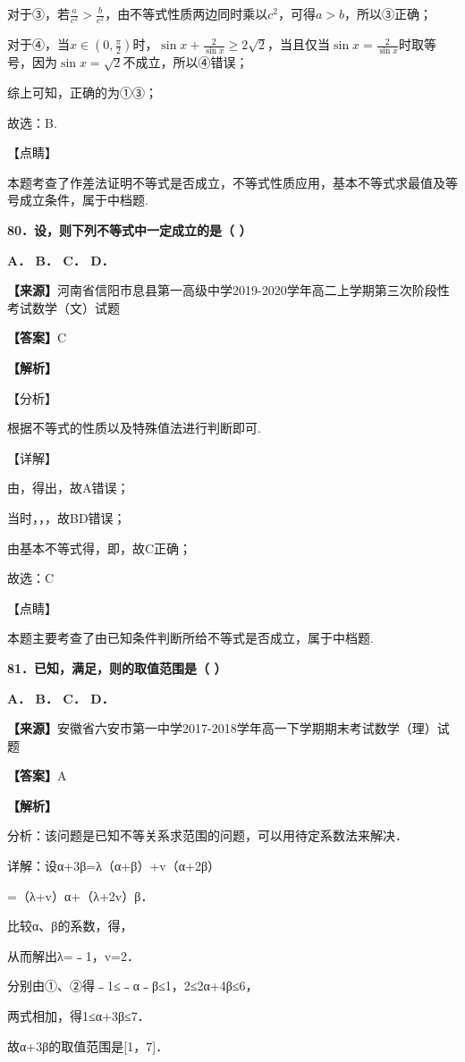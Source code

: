 对于③，若\(\frac{a}{c^{2}} > \frac{b}{c^{2}}\)，由不等式性质两边同时乘以\(c^{2}\)，可得\(a > b\)，所以③正确；

对于④，当\(x \in \left( 0,\frac{\pi}{2} \right)\)时，\(\sin x + \frac{2}{\sin x} \geq 2\sqrt{2}\)，当且仅当\(\sin x = \frac{2}{\sin x}\)时取等号，因为\(\sin x = \sqrt{2}\)不成立，所以④错误；

综上可知，正确的为①③；

故选：B.

【点睛】

本题考查了作差法证明不等式是否成立，不等式性质应用，基本不等式求最值及等号成立条件，属于中档题.

\textbf{80．设，则下列不等式中一定成立的是（ ）}

\textbf{A． B． C． D．}

\textbf{【来源】}河南省信阳市息县第一高级中学2019-2020学年高二上学期第三次阶段性考试数学（文）试题

\textbf{【答案】}C

\textbf{【解析】}

【分析】

根据不等式的性质以及特殊值法进行判断即可.

【详解】

由，得出，故A错误；

当时，，，故BD错误；

由基本不等式得，即，故C正确；

故选：C

【点睛】

本题主要考查了由已知条件判断所给不等式是否成立，属于中档题.

\textbf{81．已知，满足，则的取值范围是（ ）}

\textbf{A． B． C． D．}

\textbf{【来源】}安徽省六安市第一中学2017-2018学年高一下学期期末考试数学（理）试题

\textbf{【答案】}A

\textbf{【解析】}

分析：该问题是已知不等关系求范围的问题，可以用待定系数法来解决．

详解：设α+3β=λ（α+β）+v（α+2β）

=（λ+v）α+（λ+2v）β．

比较α、β的系数，得，

从而解出λ=﹣1，v=2．

分别由①、②得﹣1≤﹣α﹣β≤1，2≤2α+4β≤6，

两式相加，得1≤α+3β≤7．

故α+3β的取值范围是{[}1，7{]}．

